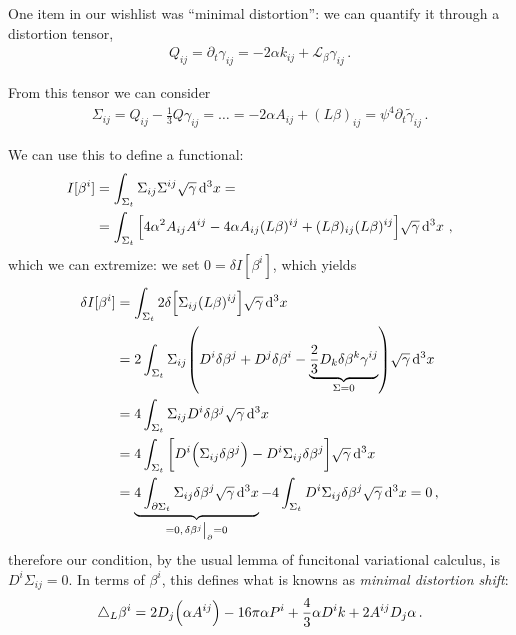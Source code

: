 \documentclass[main.tex]{subfiles}
\begin{document}
One item in our wishlist was ``minimal distortion'': we can quantify it through a distortion tensor, 
%
\begin{align}
Q_{ij} = \partial_{t} \gamma_{ij} = - 2 \alpha k_{ij} + \mathscr{L}_\beta \gamma_{ij}
\,.
\end{align}

From this tensor we can consider 
%
\begin{align}
\Sigma_{ij} = Q_{ij} - \frac{1}{3} Q \gamma_{ij} = \dots = - 2 \alpha A_{ij} + (L \beta )_{ij} = \psi^{4} \partial_{t} \widetilde{\gamma}_{ij}
\,.
\end{align}

We can use this to define a functional: 
%
\begin{align}
I[\beta^{i}] &= \int_{\Sigma _t} \Sigma_{ij} \Sigma^{ij} \sqrt{\gamma } \dd[3]{x} =  \\
&= \int_{\Sigma _t} \qty[ 4 \alpha^2 A_{ij}A^{ij} - 4 \alpha A_{ij} (L \beta )^{ij} + (L \beta )_{ij} (L \beta )^{ij} ] \sqrt{\gamma } \dd[3]{x}
\,,
\end{align}
%
which we can extremize: we set \(0 = \delta I [\beta^{i}]\), which yields 
%
\begin{align}
\delta I [\beta^{i}] &= \int_{\Sigma _t} 2 \delta \qty[ \Sigma_{ij} (L \beta )^{ij}] \sqrt{\gamma } \dd[3]{x}  \\
&= 2 \int_{\Sigma _t} \Sigma_{ij} \qty(D^{i} \delta \beta^{j} + D^{j} \delta \beta^{i} - \underbrace{\frac{2}{3} D_k \delta \beta^{k} \gamma^{ij}}_{\Sigma = 0}) \sqrt{\gamma } \dd[3]{x}  \\
&= 4 \int_{\Sigma _t} \Sigma_{ij} D^{i} \delta \beta^{j} \sqrt{\gamma } \dd[3]{x}  \\
&= 4 \int_{\Sigma _t} \qty[ D^{i} \qty(\Sigma_{ij} \delta \beta^{j}) - D^{i} \Sigma_{ij} \delta \beta^{j} ] \sqrt{\gamma } \dd[3]{x}  \\
&= \underbrace{4 \int_{\partial \Sigma _t} \Sigma_{ij} \delta \beta^{j} \sqrt{\gamma } \dd[3]{x} }_{= 0, \eval{\delta \beta^{j}}_{ \partial} = 0} - 4 
\int_{\Sigma _t} D^{i} \Sigma_{ij} \delta \beta^{j} \sqrt{\gamma } \dd[3]{x} = 0 
\,,
\end{align}
%
therefore our condition, by the usual lemma of funcitonal variational calculus, is \(D^{i} \Sigma_{ij} = 0\). 
In terms of \(\beta^{i}\), this defines what is knowns as \emph{minimal distortion shift}: 
%
\begin{align}
\triangle_L \beta^{i} = 2 D_j \qty(\alpha A^{ij}) - 16 \pi \alpha P^{i } + \frac{4}{3} \alpha D^{i } k + 2 A^{ij} D_j \alpha 
\,.
\end{align}
\end{document}
